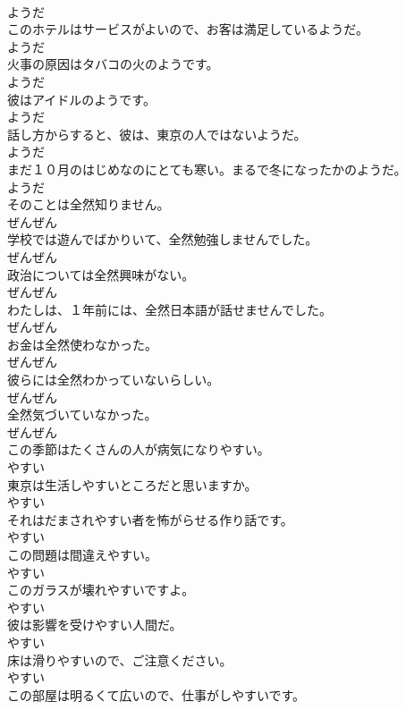 \documentclass[8pt]{extreport}
\begin{document}
\begin{CJK}{UTF8}{min}
\\	ようだ
\\	このホテルはサービスがよいので、お客は満足しているようだ。	
\\	ようだ
\\	火事の原因はタバコの火のようです。	
\\	ようだ
\\	彼はアイドルのようです。	
\\	ようだ
\\	話し方からすると、彼は、東京の人ではないようだ。	
\\	ようだ
\\	まだ１０月のはじめなのにとても寒い。まるで冬になったかのようだ。	
\\	ようだ
\\	そのことは全然知りません。	
\\	ぜんぜん
\\	学校では遊んでばかりいて、全然勉強しませんでした。	
\\	ぜんぜん
\\	政治については全然興味がない。	
\\	ぜんぜん
\\	わたしは、１年前には、全然日本語が話せませんでした。	
\\	ぜんぜん
\\	お金は全然使わなかった。	
\\	ぜんぜん
\\	彼らには全然わかっていないらしい。	
\\	ぜんぜん
\\	全然気づいていなかった。	
\\	ぜんぜん
\\	この季節はたくさんの人が病気になりやすい。	
\\	やすい
\\	東京は生活しやすいところだと思いますか。	
\\	やすい
\\	それはだまされやすい者を怖がらせる作り話です。	
\\	やすい
\\	この問題は間違えやすい。	
\\	やすい
\\	このガラスが壊れやすいですよ。	
\\	やすい
\\	彼は影響を受けやすい人間だ。	
\\	やすい
\\	床は滑りやすいので、ご注意ください。	
\\	やすい
\\	この部屋は明るくて広いので、仕事がしやすいです。	

\end{CJK}
\end{document}
